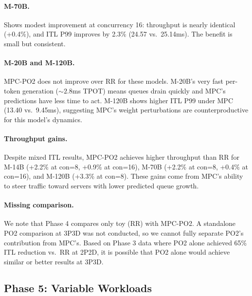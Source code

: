 \documentclass[runningheads]{llncs}
\begin{document}
\paragraph{M-70B.} Shows modest improvement at concurrency 16: throughput is nearly identical (+0.4\%), and ITL P99 improves by 2.3\% (24.57 vs.\ 25.14ms). The benefit is small but consistent.

\paragraph{M-20B and M-120B.} MPC-PO2 does not improve over RR for these models. M-20B's very fast per-token generation (${\sim}2.8$ms TPOT) means queues drain quickly and MPC's predictions have less time to act. M-120B shows higher ITL P99 under MPC (13.40 vs.\ 9.45ms), suggesting MPC's weight perturbations are counterproductive for this model's dynamics.

\paragraph{Throughput gains.} Despite mixed ITL results, MPC-PO2 achieves higher throughput than RR for M-14B (+2.2\% at con=8, +0.9\% at con=16), M-70B (+2.2\% at con=8, +0.4\% at con=16), and M-120B (+3.3\% at con=8). These gains come from MPC's ability to steer traffic toward servers with lower predicted queue growth.

\paragraph{Missing comparison.} We note that Phase 4 compares only toy (RR) with MPC-PO2. A standalone PO2 comparison at 3P3D was not conducted, so we cannot fully separate PO2's contribution from MPC's. Based on Phase 3 data where PO2 alone achieved 65\% ITL reduction vs.\ RR at 2P2D, it is possible that PO2 alone would achieve similar or better results at 3P3D.

\subsection{Phase 5: Variable Workloads}
\label{sec:phase5}
\end{document}
